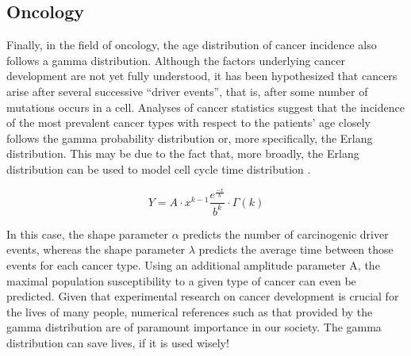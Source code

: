 \documentclass[12pt]{article}
\begin{document}
\subsection{Oncology}
Finally, in the field of oncology, the age distribution of cancer incidence also follows a gamma distribution. Although
the factors underlying cancer development are not yet fully understood, it has been hypothesized that cancers arise
after several successive “driver events”, that is, after some number of mutations occurs in a cell. Analyses of cancer
statistics suggest that the incidence of the most prevalent cancer types with respect to the patients' age closely
follows the gamma probability distribution or, more specifically, the Erlang distribution. This may be due to the fact
that, more broadly, the Erlang distribution can be used to model cell cycle time
distribution\cite{belikovNumberKeyCarcinogenic2017} .

\begin{equation*}
	Y = A\cdot x^{k-1}\frac{e^{\frac{-x}{b}}}{b^k}\cdot\Gamma(k)
\end{equation*}

In this case, the shape parameter $\alpha$ predicts the number of carcinogenic driver events, whereas the shape
parameter $\lambda$ predicts the average time between those events for each cancer type. Using an additional amplitude
parameter A, the maximal population susceptibility to a given type of cancer can even be
predicted\cite{belikovNumberKeyCarcinogenic2017}. Given that experimental research on cancer development is crucial for
the lives of many people, numerical references such as that provided by the gamma distribution are of paramount
importance in our society. The gamma distribution can save lives, if it is used wisely!


\end{document}
